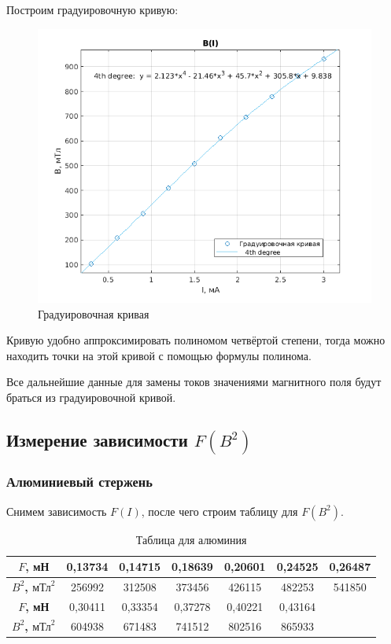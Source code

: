 Построим градуировочную кривую:

\begin{figure}[h!]
    \centering
    \includegraphics[width = 13 cm]{images/grad.png}
    \caption{Градуировочная кривая}
    \label{grad}
\end{figure}

Кривую удобно аппроксимировать полиномом четвёртой степени, тогда можно находить точки на этой кривой с помощью формулы полинома.

Все дальнейшие данные для замены токов значениями магнитного поля будут браться из градуировочной кривой.

\subsection{Измерение зависимости $F(B^2)$}

\subsubsection{Алюминиевый стержень}

Снимем зависимость $F(I)$, после чего строим таблицу для $F(B^2)$.

\begin{table}[h!]
    \begin{tabular}{|c|c|c|c|c|c|c|}
    \hline
    \textbf{$F$, мН}               & 0,13734 & 0,14715 & 0,18639 & 0,20601 & 0,24525 & 0,26487 \\ \hline
    \textbf{$B^2$, $\text{мТл}^2$} & 256992  & 312508  & 373456  & 426115  & 482253  & 541850  \\ \hline
    \textbf{$F$, мН}               & 0,30411 & 0,33354 & 0,37278 & 0,40221 & 0,43164 &         \\ \hline
    \textbf{$B^2$, $\text{мТл}^2$} & 604938  & 671483  & 741512  & 802516  & 865933  &         \\ \hline
    \end{tabular}
    \caption{Таблица для алюминия}
\end{table}

